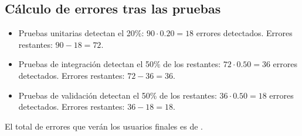 \subsection{Cálculo de errores tras las pruebas}\label{subsec:calculo-de-errores-tras-las-pruebas}
\begin{itemize}
    \item Pruebas unitarias detectan el 20\%: $90 \cdot 0.20 = 18$ errores detectados.
    Errores restantes: $90 - 18 = 72$.
    \item Pruebas de integración detectan el 50\% de los restantes: $72 \cdot 0.50 = 36$ errores detectados.
    Errores restantes: $72 - 36 = 36$.
    \item Pruebas de validación detectan el 50\% de los restantes: $36 \cdot 0.50 = 18$ errores detectados.
    Errores restantes: $36 - 18 = 18$.
\end{itemize}

\begin{solucion}
    El total de errores que verán los usuarios finales es de .
\end{solucion}

